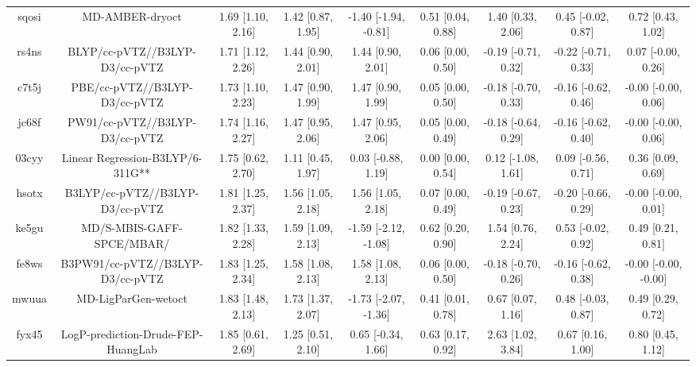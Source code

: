 \documentclass{article}
\begin{document}
\begin{center}
\begin{longtable}{|ccccccccc|}
 sqosi &                                    MD-AMBER-dryoct &  1.69 [1.10, 2.16] &  1.42 [0.87, 1.95] &  -1.40 [-1.94, -0.81] &  0.51 [0.04, 0.88] &    1.40 [0.33, 2.06] &   0.45 [-0.02, 0.87] &     0.72 [0.43, 1.02] \\
 rs4ns &                     BLYP/cc-pVTZ//B3LYP-D3/cc-pVTZ &  1.71 [1.12, 2.26] &  1.44 [0.90, 2.01] &     1.44 [0.90, 2.01] &  0.06 [0.00, 0.50] &  -0.19 [-0.71, 0.32] &  -0.22 [-0.71, 0.33] &    0.07 [-0.00, 0.26] \\
 c7t5j &                      PBE/cc-pVTZ//B3LYP-D3/cc-pVTZ &  1.73 [1.10, 2.23] &  1.47 [0.90, 1.99] &     1.47 [0.90, 1.99] &  0.05 [0.00, 0.50] &  -0.18 [-0.70, 0.33] &  -0.16 [-0.62, 0.46] &   -0.00 [-0.00, 0.06] \\
 jc68f &                     PW91/cc-pVTZ//B3LYP-D3/cc-pVTZ &  1.74 [1.16, 2.27] &  1.47 [0.95, 2.06] &     1.47 [0.95, 2.06] &  0.05 [0.00, 0.49] &  -0.18 [-0.64, 0.29] &  -0.16 [-0.62, 0.40] &   -0.00 [-0.00, 0.06] \\
 03cyy &                   Linear Regression-B3LYP/6-311G** &  1.75 [0.62, 2.70] &  1.11 [0.45, 1.97] &    0.03 [-0.88, 1.19] &  0.00 [0.00, 0.54] &   0.12 [-1.08, 1.61] &   0.09 [-0.56, 0.71] &     0.36 [0.09, 0.69] \\
 hsotx &                    B3LYP/cc-pVTZ//B3LYP-D3/cc-pVTZ &  1.81 [1.25, 2.37] &  1.56 [1.05, 2.18] &     1.56 [1.05, 2.18] &  0.07 [0.00, 0.49] &  -0.19 [-0.67, 0.23] &  -0.20 [-0.66, 0.29] &   -0.00 [-0.00, 0.01] \\
 ke5gu &                          MD/S-MBIS-GAFF-SPCE/MBAR/ &  1.82 [1.33, 2.28] &  1.59 [1.09, 2.13] &  -1.59 [-2.12, -1.08] &  0.62 [0.20, 0.90] &    1.54 [0.76, 2.24] &   0.53 [-0.02, 0.92] &     0.49 [0.21, 0.81] \\
 fe8ws &                   B3PW91/cc-pVTZ//B3LYP-D3/cc-pVTZ &  1.83 [1.25, 2.34] &  1.58 [1.08, 2.13] &     1.58 [1.08, 2.13] &  0.06 [0.00, 0.50] &  -0.18 [-0.70, 0.26] &  -0.16 [-0.62, 0.38] &  -0.00 [-0.00, -0.00] \\
 mwuua &                                MD-LigParGen-wetoct &  1.83 [1.48, 2.13] &  1.73 [1.37, 2.07] &  -1.73 [-2.07, -1.36] &  0.41 [0.01, 0.78] &    0.67 [0.07, 1.16] &   0.48 [-0.03, 0.87] &     0.49 [0.29, 0.72] \\
 fyx45 &                 LogP-prediction-Drude-FEP-HuangLab &  1.85 [0.61, 2.69] &  1.25 [0.51, 2.10] &    0.65 [-0.34, 1.66] &  0.63 [0.17, 0.92] &    2.63 [1.02, 3.84] &    0.67 [0.16, 1.00] &     0.80 [0.45, 1.12] \\

\end{longtable}
\end{center}
\end{document}
